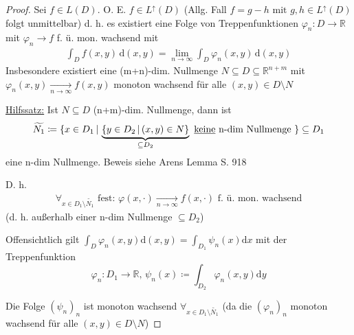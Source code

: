 \begin{proof}
    Sei $f\in L(D)$. O. E. $f\in L^\uparrow (D)$ (Allg. Fall $f=g-h \text{ mit } g,h\in L^\uparrow (D)$ folgt unmittelbar) d. h. es existiert eine Folge von Treppenfunktionen $\varphi_n\colon D \to \mathbb{R}$ mit $\varphi_n \to f$ f. ü. mon. wachsend mit
    \begin{align}\label{GW:proof}
        \int_D f(x,y) \, \text{d}(x,y) = \lim_{n \to \infty} \int_D \varphi_n (x,y) \, \text{d}(x,y)
    \end{align}
    Insbesondere existiert eine (m+n)-dim. Nullmenge $N \subseteq D \subseteq \mathbb{R}^{n+m}$ mit $\varphi_n (x,y) \xrightarrow[n \to\infty]{} f(x,y)$ monoton wachsend für alle $(x,y) \in D\setminus N$

    \underline{Hilfssatz:} Ist $N \subseteq D$ (n+m)-dim. Nullmenge, dann ist
    \[\widetilde{N_1} \coloneqq \{x\in D_1\, | \, \underbrace{\{y\in D_2\, |\, (x,y)\in N\}}_{\subseteq D_2} \text{ \underline{keine} n-dim Nullmenge }\} \subseteq D_1\] eine n-dim Nullmenge. Beweis siehe Arens Lemma S. 918

    D. h.
    \begin{align}\label{GW2:proof}
        \forall_{x\in D_1\setminus \widetilde{N_1}} \text{ fest: } \varphi(x,\cdot) \xrightarrow[n\to\infty]{} f(x,\cdot) \text{ f. ü. mon. wachsend}
    \end{align}
    (d. h. außerhalb einer n-dim Nullmenge $\subseteq D_2$)
    
    Offensichtlich gilt $\int_D \varphi_n (x,y) \text{d}(x,y) = \int_{D_1} \psi_n (x) \text{d}x$ mit der Treppenfunktion
    \[\varphi_n \colon D_1 \to \mathbb{R}, \, \psi_n (x) \coloneqq \int_{D_2} \varphi_n (x,y) \text{d}y\]

    Die Folge $(\psi_n)_n$ ist monoton wachsend $\forall_{x\in D_1\setminus \widetilde{N_1}}$ (da die $(\varphi_n)_n$ monoton wachsend für alle $(x,y) \in D \setminus N$)


\end{proof}
